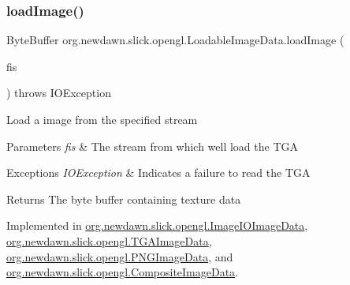 \mbox{\label{interfaceorg_1_1newdawn_1_1slick_1_1opengl_1_1_loadable_image_data_a640021b955dde7deeeeabb5ac3738d2b}} 
\subsubsection{\texorpdfstring{load\+Image()}{loadImage()}\hspace{0.1cm}{\footnotesize\ttfamily [1/3]}}
{\footnotesize\ttfamily Byte\+Buffer org.\+newdawn.\+slick.\+opengl.\+Loadable\+Image\+Data.\+load\+Image (\begin{DoxyParamCaption}\item[{Input\+Stream}]{fis }\end{DoxyParamCaption}) throws I\+O\+Exception}

Load a image from the specified stream


\begin{DoxyParams}{Parameters}
{\em fis} & The stream from which we\textquotesingle{}ll load the T\+GA \\
\hline
\end{DoxyParams}

\begin{DoxyExceptions}{Exceptions}
{\em I\+O\+Exception} & Indicates a failure to read the T\+GA \\
\hline
\end{DoxyExceptions}
\begin{DoxyReturn}{Returns}
The byte buffer containing texture data 
\end{DoxyReturn}


Implemented in \mbox{\hyperlink{classorg_1_1newdawn_1_1slick_1_1opengl_1_1_image_i_o_image_data_aa524a7c6717557a6ac60d1ac8b413950}{org.\+newdawn.\+slick.\+opengl.\+Image\+I\+O\+Image\+Data}}, \mbox{\hyperlink{classorg_1_1newdawn_1_1slick_1_1opengl_1_1_t_g_a_image_data_a9ac907fe85767aad15fa1c05af8fb093}{org.\+newdawn.\+slick.\+opengl.\+T\+G\+A\+Image\+Data}}, \mbox{\hyperlink{classorg_1_1newdawn_1_1slick_1_1opengl_1_1_p_n_g_image_data_ad5507c5228d071b2936b8aa91f18e9e1}{org.\+newdawn.\+slick.\+opengl.\+P\+N\+G\+Image\+Data}}, and \mbox{\hyperlink{classorg_1_1newdawn_1_1slick_1_1opengl_1_1_composite_image_data_afac01aa86b627c3e172aeb7e66ec2b2f}{org.\+newdawn.\+slick.\+opengl.\+Composite\+Image\+Data}}.

